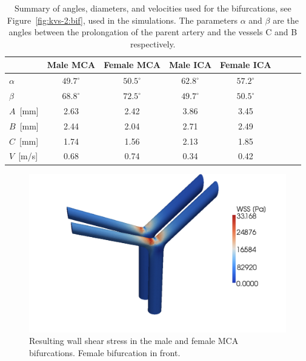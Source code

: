 \begin{table}
  \center
    \begin{tabular}{l|*{6}{c}r}
      & Male MCA & Female MCA & Male ICA & Female ICA \\
      \hline
      $\alpha$	  & $49.7^\circ$ & $50.5^\circ$   & $62.8^\circ$ & $57.2^\circ$\\
      $\beta$		  & $68.8^\circ$ & $72.5^\circ$   & $49.7^\circ$ & $50.5^\circ$\\
      $A$~[mm]		  & 2.63 & 2.42   & 3.86 & 3.45\\
      $B$~[mm]           & 2.44 & 2.04   & 2.71 & 2.49\\
      $C$~[mm] 	  & 1.74 & 1.56   & 2.13 & 1.85\\
      $V$~[m/s]	  & 0.68   & 0.74     & 0.34   & 0.42  \\
    \end{tabular}
  \caption{Summary of angles, diameters, and velocities used for the
    bifurcations, see Figure~\ref{fig:kvs-2:bif}, used in the simulations. The parameters $\alpha$ and $\beta$ are the angles
    between the prolongation of the parent artery and the vessels C
    and B respectively.}
  \label{bcs}
\end{table}

\begin{figure}
  \center\includegraphics[width=\largefig]{chapters/kvs-2/pdf/mcas_wss_II4.pdf}
    \caption{Resulting wall shear stress in the male and female MCA
      bifurcations. Female bifurcation in front.}
    \label{fig:kvs-2:mca_wss_res}
\end{figure}

